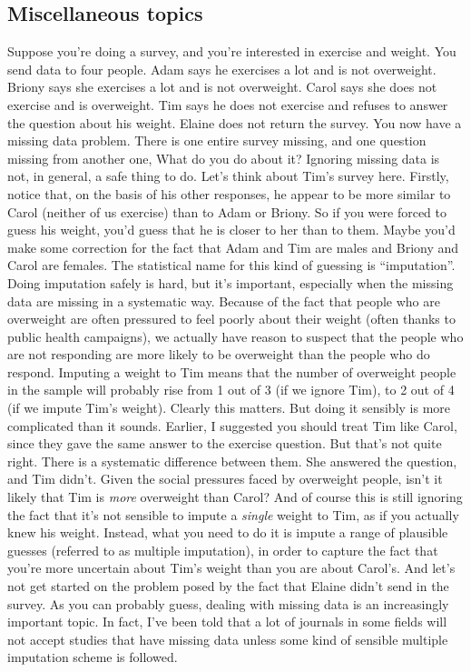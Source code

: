 \subsection{Miscellaneous topics}

\begin{itemize}
 Suppose you're doing a survey, and you're interested in exercise and weight. You send data to four people. Adam says he exercises a lot and is not overweight. Briony says she exercises a lot and is not overweight. Carol says she does not exercise and is overweight. Tim says he does not exercise and refuses to answer the question about his weight. Elaine does not return the survey. You now have a missing data problem. There is one entire survey missing, and one question missing from another one, What do you do about it? Ignoring missing data is not, in general, a safe thing to do. Let's think about Tim's survey here. Firstly, notice that, on the basis of his other responses, he appear to be more similar to Carol (neither of us exercise) than to Adam or Briony. So if you were forced to guess his weight, you'd guess that he is closer to her than to them. Maybe you'd make some correction for the fact that Adam and Tim are males and Briony and Carol are females. The statistical name for this kind of guessing is ``imputation''. Doing imputation safely is hard, but it's important, especially when the missing data are missing in a systematic way. Because of the fact that people who are overweight are often pressured to feel poorly about their weight (often thanks to public health campaigns), we actually have reason to suspect that the people who are not responding are more likely to be overweight than the people who do respond. Imputing a weight to Tim means that the number of overweight people in the sample will probably rise from 1 out of 3 (if we ignore Tim), to 2 out of 4 (if we impute Tim's weight). Clearly this matters. But doing it sensibly is more complicated than it sounds. Earlier, I suggested you should treat Tim like Carol, since they gave the same answer to the exercise question. But that's not quite right. There is a systematic difference between them. She answered the question, and Tim didn't. Given the social pressures faced by overweight people, isn't it likely that Tim is {\it more} overweight than Carol? And of course this is still ignoring the fact that it's not sensible to impute a {\it single} weight to Tim, as if you actually knew his weight. Instead, what you need to do it is impute a range of plausible guesses (referred to as multiple imputation), in order to capture the fact that you're more uncertain about Tim's weight than you are about Carol's. And let's not get started on the problem posed by the fact that Elaine didn't send in the survey. As you can probably guess, dealing with missing data is an increasingly important topic. In fact, I've been told that a lot of journals in some fields will not accept studies that have missing data unless some kind of sensible multiple imputation scheme is followed.  


\end{itemize}
